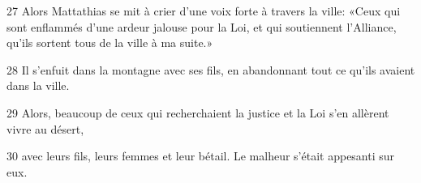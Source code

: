 
27 Alors Mattathias se mit à crier d’une voix forte à travers la ville: «Ceux qui sont enflammés d’une ardeur jalouse pour la Loi, et qui soutiennent l’Alliance, qu’ils sortent tous de la ville à ma suite.»

28 Il s’enfuit dans la montagne avec ses fils, en abandonnant tout ce qu’ils avaient dans la ville.

29 Alors, beaucoup de ceux qui recherchaient la justice et la Loi s’en allèrent vivre au désert,

30 avec leurs fils, leurs femmes et leur bétail. Le malheur s’était appesanti sur eux.
